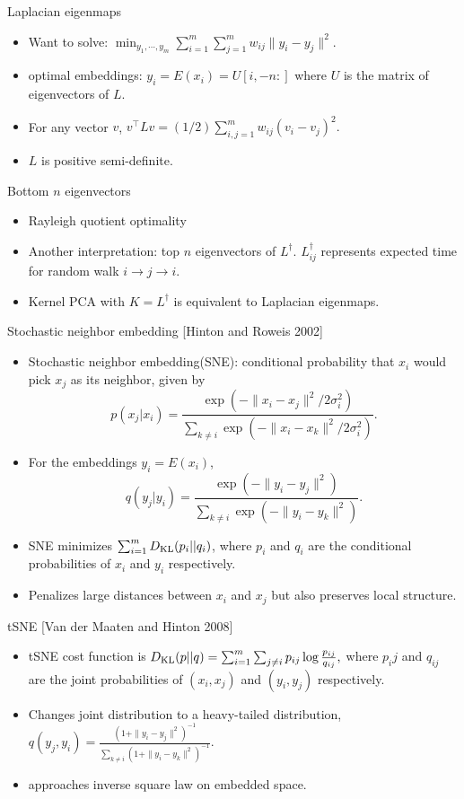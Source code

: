 \documentclass[final]{beamer}
\begin{document}
\begin{frame}{Laplacian eigenmaps}
	\begin{itemize}
		\item Want to solve: $\min_{y_1,\cdots,y_m} \sum_{i=1}^m \sum_{j=1}^m w_{ij} \|y_i - y_j\|^2.$
		\pause
		\item optimal embeddings: $y_i = E(x_i) = U[i,-n:]$ where $U$ is the matrix of eigenvectors of $L$.
		\pause
		\item For any vector $v$, $v^\top L v = (1/2)\sum_{i, j=1}^m w_{ij} (v_i - v_j)^2.$
		\pause
		\item $L$ is positive semi-definite.
	\end{itemize}
\end{frame}
\begin{frame}{Bottom $n$ eigenvectors}
	\begin{itemize}
		\item Rayleigh quotient optimality
		\pause
		\item Another interpretation: top $n$ eigenvectors of $L^\dagger.$ $L^\dagger_{ij}$ represents expected time for random walk $i \to j \to i.$ 
		\pause
		\item Kernel PCA with $K = L^\dagger$ is equivalent to Laplacian eigenmaps. 
	\end{itemize}
\end{frame}
\begin{frame}{Stochastic neighbor embedding [Hinton and Roweis 2002]}
\begin{itemize}
	\item Stochastic neighbor embedding(SNE): conditional probability that $x_i$ would pick $x_j$ as its neighbor, given by
	$$ p(x_j|x_i) = \frac{\exp(-\|x_i - x_j\|^2/2\sigma_i^2)}{\sum_{k\neq i} \exp(-\|x_i - x_k\|^2/2\sigma_i^2)}.$$
\pause
\item For the embeddings $y_i = E(x_i)$, 
	$$q(y_j|y_i) = \frac{\exp(-\|y_i - y_j\|^2)}{\sum_{k\neq i} \exp(-\|y_i - y_k\|^2)}.$$
\pause
\item SNE minimizes $\sum_{i=1}^m D_{\rm KL}(p_i||q_i)$, where $p_i$ and $q_i$ are the conditional probabilities of $x_i$ and $y_i$ respectively.
\pause
\item Penalizes large distances between $x_i$ and $x_j$ but also preserves local structure.
\end{itemize}
\end{frame}
\begin{frame}{tSNE [Van der Maaten and Hinton 2008]}
	\begin{itemize}
		\item tSNE cost function is $D_{\rm KL}(p||q) = \sum_{i=1}^m \sum_{j\neq i} p_{ij} \log \frac{p_{ij}}{q_{ij}},$ where $p_ij$ and $q_{ij}$ are the joint probabilities of $(x_i,x_j)$ and $(y_i,y_j)$ respectively.
		\item Changes joint distribution to a heavy-tailed distribution, $q(y_j, y_i) = \frac{(1 + \|y_i - y_j\|^2)^{-1}}{\sum_{k\neq i} (1 + \|y_i - y_k\|^2)^{-1}}.$ 
		\pause
		\item approaches inverse square law on embedded space.

	\end{itemize}
\end{frame}
\end{document}
